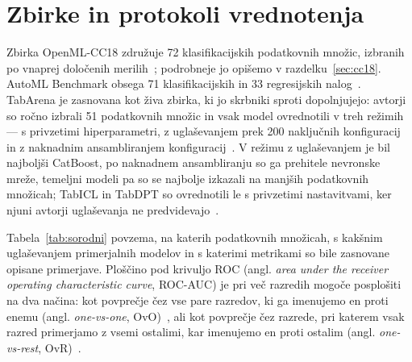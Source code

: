 \documentclass[a4paper,12pt,openright]{book}
\begin{document}
\section{Zbirke in protokoli vrednotenja}
\label{sec:sor-zbirke}

Zbirka OpenML-CC18 združuje 72 klasifikacijskih podatkovnih množic, izbranih po
vnaprej določenih merilih~\cite{bischl2021openml}; podrobneje jo opišemo v
razdelku~\ref{sec:cc18}. AutoML Benchmark obsega 71 klasifikacijskih in 33
regresijskih nalog~\cite{gijsbers2024amlb}. TabArena je zasnovana kot živa
zbirka, ki jo skrbniki sproti dopolnjujejo: avtorji so ročno izbrali 51
podatkovnih množic in vsak model ovrednotili v treh režimih --- s privzetimi
hiperparametri, z uglaševanjem prek 200 naključnih konfiguracij in z naknadnim
ansambliranjem konfiguracij~\cite{erickson2025tabarena}. V režimu z
uglaševanjem je bil najboljši CatBoost, po naknadnem ansambliranju so ga
prehitele nevronske mreže, temeljni modeli pa so se najbolje izkazali na
manjših podatkovnih množicah; TabICL in TabDPT so ovrednotili le s privzetimi
nastavitvami, ker njuni avtorji uglaševanja ne
predvidevajo~\cite{erickson2025tabarena}.

Tabela~\ref{tab:sorodni} povzema, na katerih podatkovnih množicah, s kakšnim
uglaševanjem primerjalnih modelov in s katerimi metrikami so bile zasnovane
opisane primerjave. Ploščino pod krivuljo ROC (angl. \emph{area under the
receiver operating characteristic curve}, ROC-AUC) je pri več razredih mogoče
posplošiti na dva načina: kot povprečje čez vse pare razredov, ki ga
imenujemo en proti enemu (angl. \emph{one-vs-one}, OvO)~\cite{hand2001simple},
ali kot povprečje čez razrede, pri katerem vsak razred primerjamo z vsemi
ostalimi, kar imenujemo en proti ostalim (angl. \emph{one-vs-rest},
OvR)~\cite{fawcett2006introduction}.
\end{document}
